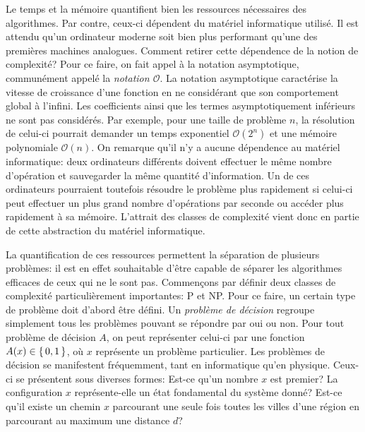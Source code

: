 Le temps et la mémoire quantifient bien les ressources nécessaires des algorithmes. Par contre, ceux-ci dépendent du matériel informatique utilisé. Il est attendu qu'un ordinateur moderne soit bien plus performant qu'une des premières machines analogues. Comment retirer cette dépendence de la notion de complexité? Pour ce faire, on fait appel à la notation asymptotique, communément appelé la \textit{notation $\mathcal{O}$}. La notation asymptotique caractérise la vitesse de croissance d'une fonction en ne considérant que son comportement global à l'infini. Les coefficients ainsi que les termes asymptotiquement inférieurs ne sont pas considérés. Par exemple, pour une taille de problème $n$, la résolution de celui-ci pourrait demander un temps exponentiel $\mathcal{O}(2^{n})$ et une mémoire polynomiale $\mathcal{O}(n)$. On remarque qu'il n'y a aucune dépendence au matériel informatique: deux ordinateurs différents doivent effectuer le même nombre d'opération et sauvegarder la même quantité d'information. Un de ces ordinateurs pourraient toutefois résoudre le problème plus rapidement si celui-ci peut effectuer un plus grand nombre d'opérations par seconde ou accéder plus rapidement à sa mémoire. L'attrait des classes de complexité vient donc en partie de cette abstraction du matériel informatique.

La quantification de ces ressources permettent la séparation de plusieurs problèmes: il est en effet souhaitable d'être capable de séparer les algorithmes efficaces de ceux qui ne le sont pas. Commençons par définir deux classes de complexité particulièrement importantes: \textsf{P} et \textsf{NP}. Pour ce faire, un certain type de problème doit d'abord être défini. Un \textit{problème de décision} regroupe simplement tous les problèmes pouvant se répondre par oui ou non. Pour tout problème de décision $A$, on peut représenter celui-ci par une fonction $A(x) \in \set{ 0, 1 }$, où $x$ représente un problème particulier. Les problèmes de décision se manifestent fréquemment, tant en informatique qu'en physique. Ceux-ci se présentent sous diverses formes: Est-ce qu'un nombre $x$ est premier? La configuration $x$ représente-elle un état fondamental du système donné? Est-ce qu'il existe un chemin $x$ parcourant une seule fois toutes les villes d'une région en parcourant au maximum une distance $d$?


